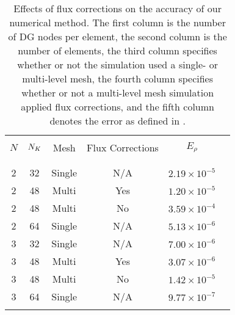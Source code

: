 \begin{table}[b]
  \scriptsize
  \renewcommand{\tabcolsep}{0.09cm}
  \centering
  \begin{tabularx}{0.4\textwidth}{cccccc} \\
    \toprule \\
    $N$              &
    $N_{K}$            &
    Mesh             &
    Flux Corrections &
    $E_{\rho}$       \\ \\
    \midrule \\
2 & 32 & Single & N/A & $2.19\times10^{-5}$ \\
2 & 48 & Multi & Yes & $1.20\times10^{-5}$ \\
2 & 48 & Multi & No & $3.59\times10^{-4}$ \\
2 & 64 & Single & N/A & $5.13\times10^{-6}$ \\
3 & 32 & Single & N/A & $7.00\times10^{-6}$ \\
3 & 48 & Multi & Yes & $3.07\times10^{-6}$ \\
3 & 48 & Multi & No & $1.42\times10^{-5}$ \\
3 & 64 & Single & N/A & $9.77\times10^{-7}$ \\
  \bottomrule \\
  \end{tabularx}
  \caption{%
Effects of flux corrections on the accuracy
of our numerical method.
The first column is the number of DG nodes per element,
the second column is the number of elements,
the third column specifies whether or not the simulation used a single-
or multi-level mesh,
the fourth column specifies whether or not a multi-level mesh simulation
applied flux corrections,
and the fifth column denotes the error as defined in
.}
  \label{tab.CR}
\end{table}
